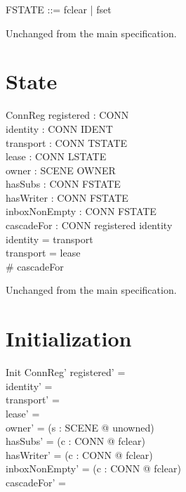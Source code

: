 \documentclass[a4paper,10pt,fleqn]{article}
\begin{document}
\begin{zed}
  FSTATE ::= fclear | fset
\end{zed}

Unchanged from the main specification.

\section{State}

\begin{schema}{ConnReg}
  registered : \power CONN \\
  identity : CONN \pfun IDENT \\
  transport : CONN \pfun TSTATE \\
  lease : CONN \pfun LSTATE \\
  owner : SCENE \fun OWNER \\
  hasSubs : CONN \fun FSTATE \\
  hasWriter : CONN \fun FSTATE \\
  inboxNonEmpty : CONN \fun FSTATE \\
  cascadeFor : \power CONN
\where
  registered \subseteq \dom identity \\
  \dom identity = \dom transport \\
  \dom transport = \dom lease \\
  \# cascadeFor 
\end{schema}

Unchanged from the main specification.

\section{Initialization}

\begin{schema}{Init}
  ConnReg'
\where
  registered' = \emptyset \\
  identity' = \emptyset \\
  transport' = \emptyset \\
  lease' = \emptyset \\
  owner' = (\lambda s : SCENE @ unowned) \\
  hasSubs' = (\lambda c : CONN @ fclear) \\
  hasWriter' = (\lambda c : CONN @ fclear) \\
  inboxNonEmpty' = (\lambda c : CONN @ fclear) \\
  cascadeFor' = \emptyset
\end{schema}
\end{document}
